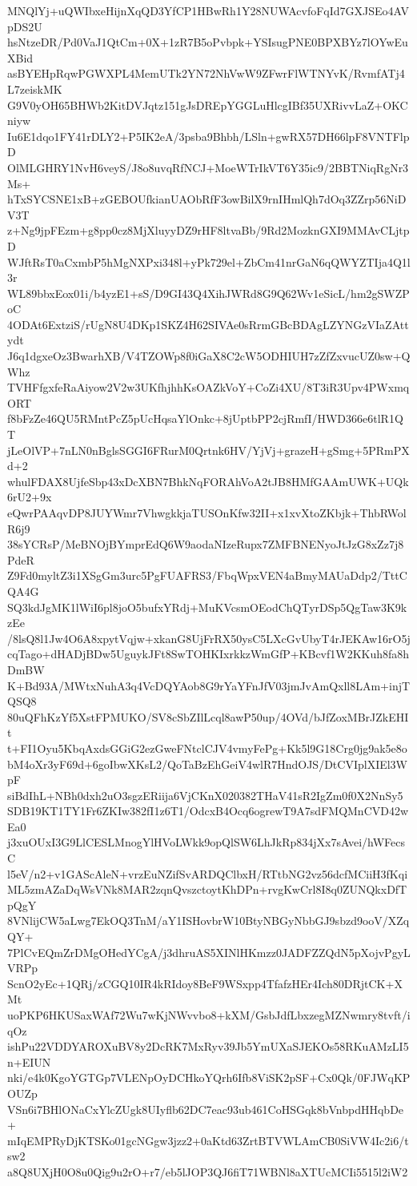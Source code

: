 MNQlYj+uQWIbxeHijnXqQD3YfCP1HBwRh1Y28NUWAcvfoFqId7GXJSEo4AVpDS2U
hsNtzeDR/Pd0VaJ1QtCm+0X+1zR7B5oPvbpk+YSIsugPNE0BPXBYz7lOYwEuXBid
asBYEHpRqwPGWXPL4MemUTk2YN72NhVwW9ZFwrFlWTNYvK/RvmfATj4L7zeiskMK
G9V0yOH65BHWb2KitDVJqtz151gJsDREpYGGLuHlcgIBf35UXRivvLaZ+OKCniyw
Iu6E1dqo1FY41rDLY2+P5IK2eA/3psba9Bhbh/LSln+gwRX57DH66lpF8VNTFlpD
OlMLGHRY1NvH6veyS/J8o8uvqRfNCJ+MoeWTrIkVT6Y35ic9/2BBTNiqRgNr3Ms+
hTxSYCSNE1xB+zGEBOUfkianUAObRfF3owBilX9rnIHmlQh7dOq3ZZrp56NiDV3T
z+Ng9jpFEzm+g8pp0cz8MjXluyyDZ9rHF8ltvaBb/9Rd2MozknGXI9MMAvCLjtpD
WJftRsT0aCxmbP5hMgNXPxi348l+yPk729el+ZbCm41nrGaN6qQWYZTIja4Q1l3r
WL89bbxEox01i/b4yzE1+sS/D9GI43Q4XihJWRd8G9Q62Wv1eSicL/hm2gSWZPoC
4ODAt6ExtziS/rUgN8U4DKp1SKZ4H62SIVAe0sRrmGBcBDAgLZYNGzVIaZAttydt
J6q1dgxeOz3BwarhXB/V4TZOWp8f0iGaX8C2cW5ODHIUH7zZfZxvucUZ0sw+QWhz
TVHFfgxfeRaAiyow2V2w3UKfhjhhKsOAZkVoY+CoZi4XU/8T3iR3Upv4PWxmqORT
f8bFzZe46QU5RMntPcZ5pUcHqsaYlOnkc+8jUptbPP2cjRmfI/HWD366e6tlR1QT
jLeOlVP+7nLN0nBglsSGGI6FRurM0Qrtnk6HV/YjVj+grazeH+gSmg+5PRmPXd+2
whulFDAX8UjfeSbp43xDcXBN7BhkNqFORAhVoA2tJB8HMfGAAmUWK+UQk6rU2+9x
eQwrPAAqvDP8JUYWmr7VhwgkkjaTUSOnKfw32II+x1xvXtoZKbjk+ThbRWolR6j9
38sYCRsP/MeBNOjBYmprEdQ6W9aodaNIzeRupx7ZMFBNENyoJtJzG8xZz7j8PdeR
Z9Fd0myltZ3i1XSgGm3urc5PgFUAFRS3/FbqWpxVEN4aBmyMAUaDdp2/TttCQA4G
SQ3kdJgMK1lWiI6pl8joO5bufxYRdj+MuKVcsmOEodChQTyrDSp5QgTaw3K9kzEe
/8lsQ8l1Jw4O6A8xpytVqjw+xkanG8UjFrRX50ysC5LXcGvUbyT4rJEKAw16rO5j
cqTago+dHADjBDw5UguykJFt8SwTOHKIxrkkzWmGfP+KBcvf1W2KKuh8fa8hDmBW
K+Bd93A/MWtxNuhA3q4VcDQYAob8G9rYaYFnJfV03jmJvAmQxll8LAm+injTQSQ8
80uQFhKzYf5XstFPMUKO/SV8cSbZIlLcql8awP50up/4OVd/bJfZoxMBrJZkEHIt
t+FI1Oyu5KbqAxdsGGiG2ezGweFNtclCJV4vmyFePg+Kk5l9G18Crg0jg9ak5e8o
bM4oXr3yF69d+6goIbwXKsL2/QoTaBzEhGeiV4wlR7HndOJS/DtCVIplXIEl3WpF
siBdIhL+NBh0dxh2uO3sgzERiija6VjCKnX020382THaV41sR2IgZm0f0X2NnSy5
SDB19KT1TY1Fr6ZKIw382fI1z6T1/OdcxB4Ocq6ogrewT9A7sdFMQMnCVD42wEa0
j3xuOUxI3G9LlCESLMnogYlHVoLWkk9opQlSW6LhJkRp834jXx7sAvei/hWFecsC
l5eV/n2+v1GAScAleN+vrzEuNZifSvARDQClbxH/RTtbNG2vz56dcfMCiiH3fKqi
ML5zmAZaDqWsVNk8MAR2zqnQvszctoytKhDPn+rvgKwCrl8I8q0ZUNQkxDfTpQgY
8VNlijCW5aLwg7EkOQ3TnM/aY1ISHovbrW10BtyNBGyNbbGJ9sbzd9ooV/XZqQY+
7PlCvEQmZrDMgOHedYCgA/j3dhruAS5XINlHKmzz0JADFZZQdN5pXojvPgyLVRPp
ScnO2yEc+1QRj/zCGQ10IR4kRIdoy8BeF9WSxpp4TfafzHEr4Ich80DRjtCK+XMt
uoPKP6HKUSaxWAf72Wu7wKjNWvvbo8+kXM/GsbJdfLbxzegMZNwmry8tvft/iqOz
ishPu22VDDYAROXuBV8y2DcRK7MxRyv39Jb5YmUXaSJEKOs58RKuAMzLI5n+EIUN
nki/e4k0KgoYGTGp7VLENpOyDCHkoYQrh6Ifb8ViSK2pSF+Cx0Qk/0FJWqKPOUZp
VSn6i7BHlONaCxYlcZUgk8UIyflb62DC7eac93ub461CoHSGqk8bVnbpdHHqbDe+
mIqEMPRyDjKTSKo01gcNGgw3jzz2+0aKtd63ZrtBTVWLAmCB0SiVW4Ic2i6/tsw2
a8Q8UXjH0O8u0Qig9u2rO+r7/eb5lJOP3QJ6fiT71WBNl8aXTUcMCIi5515l2iW2

